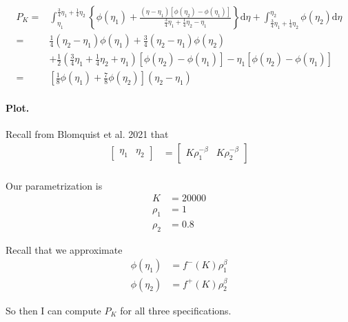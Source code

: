\documentclass{article}
\begin{document}
\begin{solution}
\[
\begin{aligned}P_{K}= & \int_{\eta_{1}}^{\frac{3}{4}\eta_{1}+\frac{1}{4}\eta_{2}}\left\{ \phi\left(\eta_{1}\right)+\frac{\left(\eta-\eta_{1}\right)\left[\phi\left(\eta_{2}\right)-\phi\left(\eta_{1}\right)\right]}{\frac{3}{4}\eta_{1}+\frac{1}{4}\eta_{2}-\eta_{1}}\right\} \mathrm{d}\eta+\int_{\frac{3}{4}\eta_{1}+\frac{1}{4}\eta_{2}}^{\eta_{2}}\phi\left(\eta_{2}\right)\mathrm{d}\eta\\
= & \frac{1}{4}\left(\eta_{2}-\eta_{1}\right)\phi\left(\eta_{1}\right)+\frac{3}{4}\left(\eta_{2}-\eta_{1}\right)\phi\left(\eta_{2}\right)\\
 & +\frac{1}{2}\left(\frac{3}{4}\eta_{1}+\frac{1}{4}\eta_{2}+\eta_{1}\right)\left[\phi\left(\eta_{2}\right)-\phi\left(\eta_{1}\right)\right]-\eta_{1}\left[\phi\left(\eta_{2}\right)-\phi\left(\eta_{1}\right)\right]\\
= & {\left[\frac{1}{8}\phi\left(\eta_{1}\right)+\frac{7}{8}\phi\left(\eta_{2}\right)\right]\left(\eta_{2}-\eta_{1}\right)}
\end{aligned}
\]


\paragraph{Plot.}

Recall from Blomquist et al. 2021 that 
\begin{align*}
\begin{bmatrix}\eta_{1} & \eta_{2}\end{bmatrix} & =\begin{bmatrix}K\rho_{1}^{-\beta} & K\rho_{2}^{-\beta}\end{bmatrix}\\
\end{align*}

Our parametrization is 
\begin{align*}
K & =20000\\
\rho_{1} & =1\\
\rho_{2} & =0.8
\end{align*}

Recall that we approximate
\begin{align*}
\phi\left(\eta_{1}\right) & =f^{-}\left(K\right)\rho_{1}^{\beta}\\
\phi\left(\eta_{2}\right) & =f^{+}\left(K\right)\rho_{2}^{\beta}
\end{align*}

So then I can compute $P_{K}$ for all three specifications. 


\end{solution}
\end{document}
